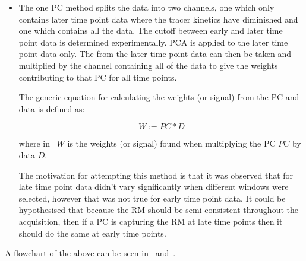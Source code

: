                     \begin{itemize}
                        \item The one \gls{PC} method splits the data into two channels, one which only contains later time point data where the tracer kinetics have diminished and one which contains all the data. The cutoff between early and later time point data is determined experimentally. \gls{PCA} is applied to the later time point data only. The  from the later time point data can then be taken and multiplied by the channel containing all of the data to give the weights contributing to that \gls{PC} for all time points.
                        
                        The generic equation for calculating the weights (or signal) from the \gls{PC} and data is defined as:

                        \begin{equation} \label{eq:pca_data_driven_surrogate_signal_extraction_methods_for_dynamic_pet_methods_pc_weights}
                            W := PC * D
                        \end{equation}
        
                        \noindent where in~ $W$ is the weights (or signal) found when multiplying the \gls{PC} $PC$ by data $D$.
                        
                        The motivation for attempting this method is that it was observed that  for late time point data didn't vary significantly when different windows were selected, however that was not true for early time point data. It could be hypothesised that because the \gls{RM} should be semi-consistent throughout the acquisition, then if a \gls{PC} is capturing the \gls{RM} at late time points then it should do the same at early time points.
                    \end{itemize}
                    
                    A flowchart of the above can be seen in~ and~.
                
